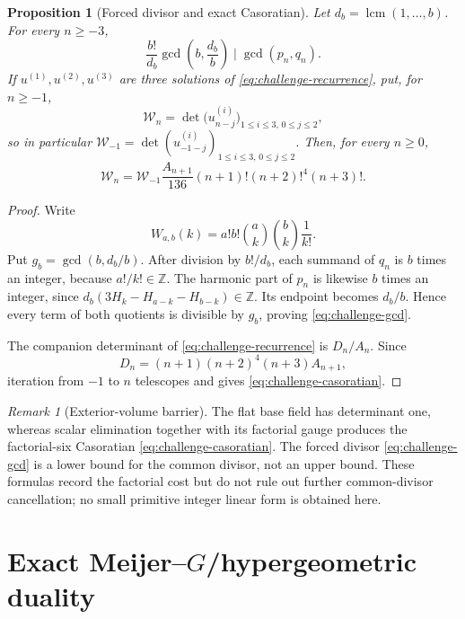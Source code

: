 \documentclass[11pt]{article}
\newtheorem{proposition}[theorem]{Proposition}
\theoremstyle{definition}
\theoremstyle{remark}
\newtheorem{remark}[theorem]{Remark}
\newcommand{\Z}{\mathbb Z}
\newcommand{\lcm}{\operatorname{lcm}}
\begin{document}
\begin{proposition}[Forced divisor and exact Casoratian]
\label{prop:challenge-arithmetic}
Let \(d_b=\lcm(1,\ldots,b)\).  For every \(n\ge-3\),
\begin{equation}\label{eq:challenge-gcd}
 \boxed{\displaystyle
 \frac{b!}{d_b}\gcd\!\left(b,\frac{d_b}{b}\right)
 \mid\gcd(p_n,q_n).}
\end{equation}
If \(u^{(1)},u^{(2)},u^{(3)}\) are three solutions of
\eqref{eq:challenge-recurrence}, put, for \(n\ge-1\),
\[
 \mathcal W_n=\det\bigl(u^{(i)}_{n-j}\bigr)_{1\le i\le3,\,0\le j\le2},
\]
so in particular
\(\mathcal W_{-1}=\det(u^{(i)}_{-1-j})_{1\le i\le3,\,0\le j\le2}\).
Then, for every \(n\ge0\),
\begin{equation}\label{eq:challenge-casoratian}
 \boxed{\displaystyle
 \mathcal W_n=\mathcal W_{-1}
 \frac{A_{n+1}}{136}
 (n+1)!(n+2)!^4(n+3)!.}
\end{equation}
\end{proposition}

\begin{proof}
Write
\[
 W_{a,b}(k)=a!b!\binom ak\binom bk\frac1{k!}.
\]
Put \(g_b=\gcd(b,d_b/b)\).  After division by \(b!/d_b\), each summand of
\(q_n\) is \(b\) times an integer, because \(a!/k!\in\Z\).  The harmonic
part of \(p_n\) is likewise \(b\) times an integer, since
\(d_b(3H_k-H_{a-k}-H_{b-k})\in\Z\).  Its endpoint becomes \(d_b/b\).
Hence every term of both quotients is divisible by \(g_b\), proving
\eqref{eq:challenge-gcd}.

The companion determinant of \eqref{eq:challenge-recurrence} is
\(D_n/A_n\).  Since
\[
 D_n=(n+1)(n+2)^4(n+3)A_{n+1},
\]
iteration from \(-1\) to \(n\) telescopes and gives
\eqref{eq:challenge-casoratian}.
\end{proof}

\begin{remark}[Exterior-volume barrier]
The flat base field has determinant one, whereas scalar elimination together
with its factorial gauge produces the factorial-six Casoratian
\eqref{eq:challenge-casoratian}.  The forced divisor
\eqref{eq:challenge-gcd} is a lower bound for the common divisor, not an
upper bound.  These formulas record the factorial cost but do not rule out
further common-divisor cancellation; no small primitive integer linear form
is obtained here.
\end{remark}

\section{Exact Meijer--\texorpdfstring{\(G\)}{G}/hypergeometric duality}
\label{sec:meijer-duality}
\end{document}

